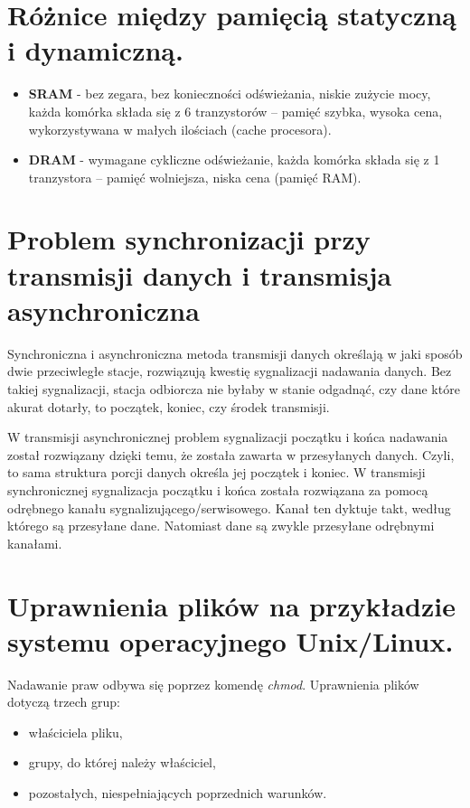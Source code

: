 \documentclass[12pt,a4paper]{article}
\begin{document}
	\section{Różnice między pamięcią statyczną i dynamiczną.}
	\label{sec:statdyn}
	\begin{itemize}
		\item \textbf{SRAM} - bez zegara, bez konieczności odświeżania, niskie zużycie mocy, każda komórka składa się z 6 tranzystorów -- pamięć szybka, wysoka cena, wykorzystywana w małych ilościach (cache procesora). 
		\item \textbf{DRAM} -  wymagane cykliczne odświeżanie, każda komórka składa się z 1 tranzystora -- pamięć wolniejsza, niska cena (pamięć RAM).
	\end{itemize}

	\section{Problem synchronizacji przy transmisji danych i transmisja asynchroniczna}
	Synchroniczna i asynchroniczna metoda transmisji danych określają w jaki sposób dwie przeciwległe stacje, rozwiązują kwestię sygnalizacji nadawania danych. Bez takiej sygnalizacji, stacja odbiorcza nie byłaby w stanie odgadnąć, czy dane które akurat dotarły, to początek, koniec, czy środek transmisji.

	W transmisji asynchronicznej problem sygnalizacji początku i końca nadawania został rozwiązany dzięki temu, że została zawarta w przesyłanych danych. Czyli, to sama struktura porcji danych określa jej początek i koniec.
	W transmisji synchronicznej sygnalizacja początku i końca została rozwiązana za pomocą odrębnego kanału sygnalizującego/serwisowego. Kanał ten dyktuje takt, według którego są przesyłane dane. Natomiast dane są zwykle przesyłane odrębnymi kanałami.

	\section{Uprawnienia plików na przykładzie systemu operacyjnego Unix/Linux.}
	Nadawanie praw odbywa się poprzez komendę \textit{chmod}. Uprawnienia plików dotyczą trzech grup:
	\begin{itemize}
		\item właściciela pliku,
		\item grupy, do której należy właściciel,
		\item pozostałych, niespełniających poprzednich warunków.
	\end{itemize}
	
\end{document}
